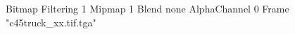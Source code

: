 {Bitmap
	{Filtering 1}
	{Mipmap 1}
	{Blend none}
	{AlphaChannel 0}
	{Frame "c45truck_xx.tif.tga"}
}
